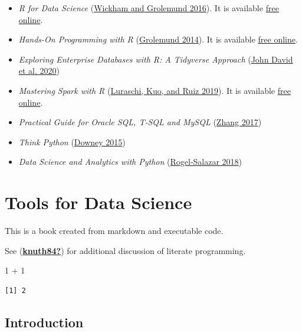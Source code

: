 \documentclass[
  letterpaper,
  DIV=11,
  numbers=noendperiod]{scrreprt}
\newenvironment{Shaded}{\begin{snugshade}}{\end{snugshade}}
\newcommand{\DecValTok}[1]{\textcolor[rgb]{0.68,0.00,0.00}{#1}}
\newcommand{\SpecialCharTok}[1]{\textcolor[rgb]{0.37,0.37,0.37}{#1}}
\providecommand{\tightlist}{%
  \setlength{\itemsep}{0pt}\setlength{\parskip}{0pt}}\usepackage{longtable,booktabs,array}
\begin{document}
\begin{itemize}
\tightlist
\item
  \emph{R for Data Science}
  (\protect\hyperlink{ref-wickham2016r}{Wickham and Grolemund 2016}). It
  is available \href{https://r4ds.had.co.nz/}{free online}.
\item
  \emph{Hands-On Programming with R}
  (\protect\hyperlink{ref-grolemund2014hands}{Grolemund 2014}). It is
  available \href{https://rstudio-education.github.io/hopr/}{free
  online}.
\item
  \emph{Exploring Enterprise Databases with R: A Tidyverse Approach}
  (\protect\hyperlink{ref-databaser2020}{John David et al. 2020})
\item
  \emph{Mastering Spark with R}
  (\protect\hyperlink{ref-luraschi2019mastering}{Luraschi, Kuo, and Ruiz
  2019}). It is available \href{https://therinspark.com/index.html}{free
  online}.
\item
  \emph{Practical Guide for Oracle SQL, T-SQL and MySQL}
  (\protect\hyperlink{ref-zhang2017practical}{Zhang 2017})
\item
  \emph{Think Python} (\protect\hyperlink{ref-Allenpython}{Downey 2015})
\item
  \emph{Data Science and Analytics with Python}
  (\protect\hyperlink{ref-rogel2018data}{Rogel-Salazar 2018})
\end{itemize}

\part{Tools for Data Science}

This is a book created from markdown and executable code.

See (\protect\hyperlink{ref-knuth84}{\textbf{knuth84?}}) for additional
discussion of literate programming.

\begin{Shaded}
\begin{Highlighting}[]
\DecValTok{1} \SpecialCharTok{+} \DecValTok{1}
\end{Highlighting}
\end{Shaded}

\begin{verbatim}
[1] 2
\end{verbatim}

\hypertarget{introduction}{%
\chapter*{Introduction}\label{introduction}}
\end{document}
